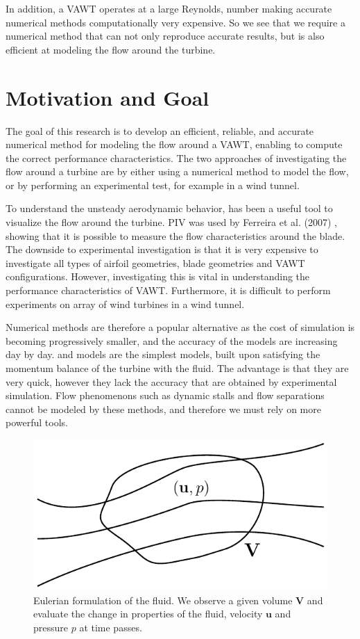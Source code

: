 In addition, a VAWT operates at a large Reynolds, number making accurate numerical methods computationally very expensive. So we see that we require a numerical method that can not only reproduce accurate results, but is also efficient at modeling the flow around the turbine.

\section{Motivation and Goal}
The goal of this research is to develop an efficient, reliable, and accurate numerical method for modeling the flow around a  VAWT, enabling to compute the correct performance characteristics. The two approaches of investigating the flow around a turbine are by either using a numerical method to model the flow, or by performing an experimental test, for example in a wind tunnel.

To understand the unsteady aerodynamic behavior,  has been a useful tool to visualize the flow around the turbine. PIV was used by Ferreira et al. (2007) \cite{Ferreira2007a}, showing that it is possible to measure the flow characteristics around the blade. The downside to experimental investigation is that it is very expensive to investigate all types of airfoil geometries, blade geometries and VAWT configurations. However, investigating this is vital in understanding the performance characteristics of VAWT. Furthermore, it is difficult to perform experiments on array of wind turbines in a wind tunnel.

Numerical methods are therefore a popular alternative as the cost of simulation is becoming progressively smaller, and the accuracy of the models are increasing day by day.  and  models are the simplest models, built upon satisfying the momentum balance of the turbine with the fluid. The advantage is that they are very quick, however they lack the accuracy that are obtained by experimental simulation. Flow phenomenons such as dynamic stalls and flow separations cannot be modeled by these methods, and therefore we must rely on more powerful tools.

	\begin{figure}[!t]
		\centering
		\includegraphics[width=0.4\linewidth]{figures/introduction/eulerianRF.pdf}
		\caption{Eulerian formulation of the fluid. We observe a given volume $\mathbf{V}$ and evaluate the change in properties of the fluid, velocity $\mathbf{u}$ and pressure $p$ at time passes.}
		\label{fig:eulerianRF}
	\end{figure}

